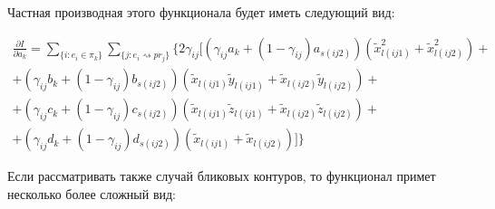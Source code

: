 \documentclass[a4paper,12pt, titlepage]{article}
\begin{document}
\begin{flushleft}
 Частная производная этого функционала будет иметь следующий вид:
\end{flushleft}

$$
\begin{aligned}
  \frac{\partial I}{\partial a_{k}} = 
  \sum\limits_{\{i : e_{i} \in \pi_{k}\}} \sum\limits_{\{j:e_{i} \rightsquigarrow pr_{j}\}}
  \{
    2 \gamma_{ij} 
    [
      (\gamma_{ij} a_{k} + (1 - \gamma_{ij}) a_{s(ij2)}) 
      (\tilde{x}_{l(ij1)}^{2} + \tilde{x}_{l(ij2)}^{2}) + \\ +
      (\gamma_{ij} b_{k} + (1 - \gamma_{ij}) b_{s(ij2)}) 
      (\tilde{x}_{l(ij1)} \tilde{y}_{l(ij1)} + \tilde{x}_{l(ij2)} \tilde{y}_{l(ij2)}) + \\ +
      (\gamma_{ij} c_{k} + (1 - \gamma_{ij}) c_{s(ij2)}) 
      (\tilde{x}_{l(ij1)} \tilde{z}_{l(ij1)} + \tilde{x}_{l(ij2)} \tilde{z}_{l(ij2)}) + \\ + 
      (\gamma_{ij} d_{k} + (1 - \gamma_{ij}) d_{s(ij2)}) 
      (\tilde{x}_{l(ij1)} + \tilde{x}_{l(ij2)})
    ]
  \}
\end{aligned}
$$

\begin{flushleft}
 Если рассматривать также случай бликовых контуров, то функционал примет несколько более сложный вид:
\end{flushleft}
\end{document}
